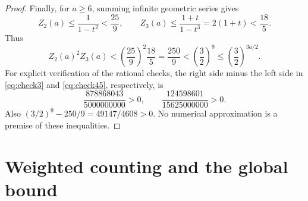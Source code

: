\documentclass[11pt,a4paper]{article}
\theoremstyle{remark}
\begin{document}
\begin{proof}
Finally, for $a\ge6$, summing infinite geometric series gives
\[
Z_2(a)\le\frac1{1-t^2}<\frac{25}{9},\qquad
Z_3(a)\le\frac{1+t}{1-t^3}=2(1+t)<\frac{18}{5}.
\]
Thus
\begin{equation}\label{eq:check6}
Z_2(a)^2Z_3(a)<\left(\frac{25}{9}\right)^2\frac{18}{5}
=\frac{250}{9}<\left(\frac32\right)^9
\le\left(\frac32\right)^{3a/2}.
\end{equation}
For explicit verification of the rational checks, the right side minus the left side in \eqref{eq:check3} and \eqref{eq:check45}, respectively, is
\[
\frac{878868043}{5000000000}>0,
\qquad
\frac{124598601}{15625000000}>0.
\]
Also $(3/2)^9-250/9=49147/4608>0$. No numerical approximation is a premise of these inequalities.
\end{proof}

\section{Weighted counting and the global bound}
\end{document}

